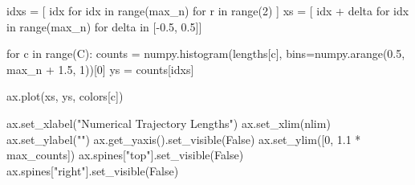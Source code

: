 \documentclass[
  letterpaper,
  DIV=11,
  numbers=noendperiod]{scrartcl}
\newenvironment{Shaded}{\begin{snugshade}}{\end{snugshade}}
\newcommand{\BuiltInTok}[1]{\textcolor[rgb]{0.00,0.23,0.31}{#1}}
\newcommand{\ControlFlowTok}[1]{\textcolor[rgb]{0.00,0.23,0.31}{#1}}
\newcommand{\DecValTok}[1]{\textcolor[rgb]{0.68,0.00,0.00}{#1}}
\newcommand{\FloatTok}[1]{\textcolor[rgb]{0.68,0.00,0.00}{#1}}
\newcommand{\KeywordTok}[1]{\textcolor[rgb]{0.00,0.23,0.31}{#1}}
\newcommand{\NormalTok}[1]{\textcolor[rgb]{0.00,0.23,0.31}{#1}}
\newcommand{\OperatorTok}[1]{\textcolor[rgb]{0.37,0.37,0.37}{#1}}
\newcommand{\StringTok}[1]{\textcolor[rgb]{0.13,0.47,0.30}{#1}}
\newcommand{\VariableTok}[1]{\textcolor[rgb]{0.07,0.07,0.07}{#1}}
\begin{document}
\begin{Shaded}
\begin{Highlighting}[]
\NormalTok{  idxs }\OperatorTok{=}\NormalTok{ [ idx }\ControlFlowTok{for}\NormalTok{ idx }\KeywordTok{in} \BuiltInTok{range}\NormalTok{(max\_n) }\ControlFlowTok{for}\NormalTok{ r }\KeywordTok{in} \BuiltInTok{range}\NormalTok{(}\DecValTok{2}\NormalTok{) ]}
\NormalTok{  xs }\OperatorTok{=}\NormalTok{ [ idx }\OperatorTok{+}\NormalTok{ delta }\ControlFlowTok{for}\NormalTok{ idx }\KeywordTok{in} \BuiltInTok{range}\NormalTok{(max\_n) }\ControlFlowTok{for}\NormalTok{ delta }\KeywordTok{in}\NormalTok{ [}\OperatorTok{{-}}\FloatTok{0.5}\NormalTok{, }\FloatTok{0.5}\NormalTok{]]}
  
  \ControlFlowTok{for}\NormalTok{ c }\KeywordTok{in} \BuiltInTok{range}\NormalTok{(C):}
\NormalTok{    counts }\OperatorTok{=}\NormalTok{ numpy.histogram(lengths[c], }
\NormalTok{                             bins}\OperatorTok{=}\NormalTok{numpy.arange(}\FloatTok{0.5}\NormalTok{, max\_n }\OperatorTok{+} \FloatTok{1.5}\NormalTok{, }\DecValTok{1}\NormalTok{))[}\DecValTok{0}\NormalTok{]}
\NormalTok{    ys }\OperatorTok{=}\NormalTok{ counts[idxs]}
    
\NormalTok{    ax.plot(xs, ys, colors[c])}
  
\NormalTok{  ax.set\_xlabel(}\StringTok{"Numerical Trajectory Lengths"}\NormalTok{)}
\NormalTok{  ax.set\_xlim(nlim)}
\NormalTok{  ax.set\_ylabel(}\StringTok{""}\NormalTok{)}
\NormalTok{  ax.get\_yaxis().set\_visible(}\VariableTok{False}\NormalTok{)}
\NormalTok{  ax.set\_ylim([}\DecValTok{0}\NormalTok{, }\FloatTok{1.1} \OperatorTok{*}\NormalTok{ max\_counts])}
\NormalTok{  ax.spines[}\StringTok{"top"}\NormalTok{].set\_visible(}\VariableTok{False}\NormalTok{)}
\NormalTok{  ax.spines[}\StringTok{"right"}\NormalTok{].set\_visible(}\VariableTok{False}\NormalTok{)}
\end{Highlighting}
\end{Shaded}
\end{document}
